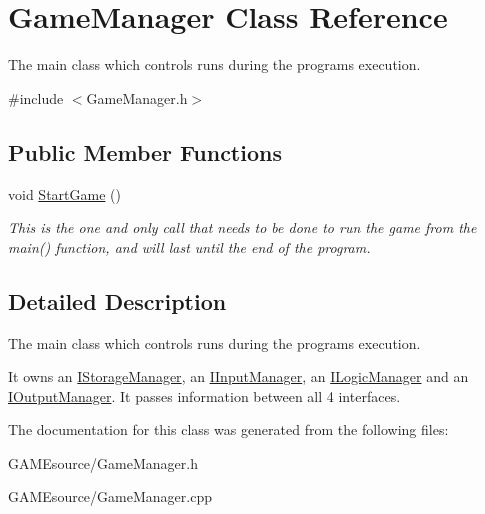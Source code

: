 \hypertarget{class_game_manager}{}\section{Game\+Manager Class Reference}
\label{class_game_manager}


The main class which controls runs during the programs execution.  




{\ttfamily \#include $<$Game\+Manager.\+h$>$}

\subsection*{Public Member Functions}
\begin{DoxyCompactItemize}
\item 
\mbox{\label{class_game_manager_a3af49a72977052275a1217c5018c737f}} 
void \mbox{\hyperlink{class_game_manager_a3af49a72977052275a1217c5018c737f}{Start\+Game}} ()
\begin{DoxyCompactList}\small\item\em This is the one and only call that needs to be done to run the game from the main() function, and will last until the end of the program. \end{DoxyCompactList}\end{DoxyCompactItemize}


\subsection{Detailed Description}
The main class which controls runs during the programs execution. 

It owns an \mbox{\hyperlink{class_i_storage_manager}{I\+Storage\+Manager}}, an \mbox{\hyperlink{class_i_input_manager}{I\+Input\+Manager}}, an \mbox{\hyperlink{class_i_logic_manager}{I\+Logic\+Manager}} and an \mbox{\hyperlink{class_i_output_manager}{I\+Output\+Manager}}. It passes information between all 4 interfaces. 

The documentation for this class was generated from the following files\+:\begin{DoxyCompactItemize}
\item 
G\+A\+M\+Esource/Game\+Manager.\+h\item 
G\+A\+M\+Esource/Game\+Manager.\+cpp\end{DoxyCompactItemize}
